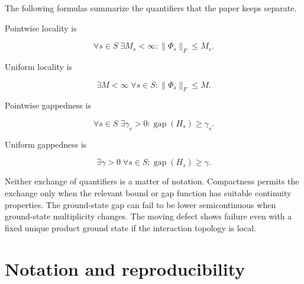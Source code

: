 \documentclass[12pt]{article}
\theoremstyle{definition}
\theoremstyle{remark}
\begin{document}
The following formulas summarize the quantifiers that the paper keeps
separate.

Pointwise locality is

\begin{equation}
  \forall s\in S\;\exists M_s<\infty:
  \|\Phi_s\|_F\le M_s.
\end{equation}

Uniform locality is

\begin{equation}
  \exists M<\infty\;\forall s\in S:
  \|\Phi_s\|_F\le M.
\end{equation}

Pointwise gappedness is

\begin{equation}
  \forall s\in S\;\exists\gamma_s>0:
  \operatorname{gap}(H_s)\ge\gamma_s.
\end{equation}

Uniform gappedness is

\begin{equation}
  \exists\gamma>0\;\forall s\in S:
  \operatorname{gap}(H_s)\ge\gamma.
\end{equation}

Neither exchange of quantifiers is a matter of notation.  Compactness permits
the exchange only when the relevant bound or gap function has suitable
continuity properties.  The ground-state gap can fail to be lower
semicontinuous when ground-state multiplicity changes.  The moving defect
shows failure even with a fixed unique product ground state if the interaction
topology is local.

\section{Notation and reproducibility}
\end{document}
